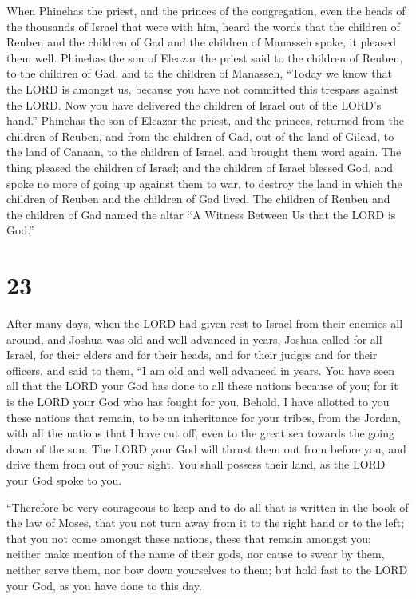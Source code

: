  When Phinehas the priest, and the princes of the
congregation, even the heads of the thousands of Israel that were with
him, heard the words that the children of Reuben and the children of Gad
and the children of Manasseh spoke, it pleased them well. 
Phinehas the son of Eleazar the priest said to the children of Reuben,
to the children of Gad, and to the children of Manasseh, ``Today we know
that the LORD is amongst us, because you have not committed this
trespass against the LORD. Now you have delivered the children of Israel
out of the LORD's hand.''  Phinehas the son of Eleazar the
priest, and the princes, returned from the children of Reuben, and from
the children of Gad, out of the land of Gilead, to the land of Canaan,
to the children of Israel, and brought them word again. 
The thing pleased the children of Israel; and the children of Israel
blessed God, and spoke no more of going up against them to war, to
destroy the land in which the children of Reuben and the children of Gad
lived.  The children of Reuben and the children of Gad
named the altar ``A Witness Between Us that the LORD is God.''

\hypertarget{section-22}{%
\section{23}\label{section-22}}

 After many days, when the LORD had given rest to Israel
from their enemies all around, and Joshua was old and well advanced in
years,  Joshua called for all Israel, for their elders and
for their heads, and for their judges and for their officers, and said
to them, ``I am old and well advanced in years.  You have
seen all that the LORD your God has done to all these nations because of
you; for it is the LORD your God who has fought for you. 
Behold, I have allotted to you these nations that remain, to be an
inheritance for your tribes, from the Jordan, with all the nations that
I have cut off, even to the great sea towards the going down of the sun.
 The LORD your God will thrust them out from before you, and
drive them from out of your sight. You shall possess their land, as the
LORD your God spoke to you.

 ``Therefore be very courageous to keep and to do all that
is written in the book of the law of Moses, that you not turn away from
it to the right hand or to the left;  that you not come
amongst these nations, these that remain amongst you; neither make
mention of the name of their gods, nor cause to swear by them, neither
serve them, nor bow down yourselves to them;  but hold fast
to the LORD your God, as you have done to this day.


